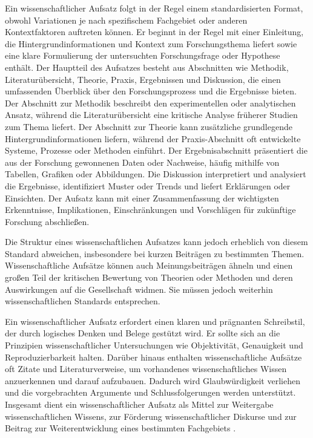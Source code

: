 \documentclass[12pt,        %
  english,ngerman,          %
  paper=a4,                 %
  captions=tablesignature,  %
  listof=numbered,          %
  bibliography=totoc,       %
  headings=small,           %
  headinclude=false,        %
  footinclude=false,        %
  parskip=half-,            %
  oneside,                  %
  DIV=12                    %
  ]{scrartcl}                %
\begin{document}
Ein wissenschaftlicher Aufsatz folgt in der Regel einem standardisierten Format, obwohl Variationen je nach spezifischem Fachgebiet oder anderen Kontextfaktoren auftreten können. Er beginnt in der Regel mit einer Einleitung, die Hintergrundinformationen und Kontext zum Forschungsthema liefert sowie eine klare Formulierung der untersuchten Forschungsfrage oder Hypothese enthält. Der Hauptteil des Aufsatzes besteht aus Abschnitten wie Methodik, Literaturübersicht, Theorie, Praxis, Ergebnissen und Diskussion, die einen umfassenden Überblick über den Forschungsprozess und die Ergebnisse bieten. Der Abschnitt zur Methodik beschreibt den experimentellen oder analytischen Ansatz, während die Literaturübersicht eine kritische Analyse früherer Studien zum Thema liefert. Der Abschnitt zur Theorie kann zusätzliche grundlegende Hintergrundinformationen liefern, während der Praxis-Abschnitt oft entwickelte Systeme, Prozesse oder Methoden einführt. Der Ergebnisabschnitt präsentiert die aus der Forschung gewonnenen Daten oder Nachweise, häufig mithilfe von Tabellen, Grafiken oder Abbildungen. Die Diskussion interpretiert und analysiert die Ergebnisse, identifiziert Muster oder Trends und liefert Erklärungen oder Einsichten. Der Aufsatz kann mit einer Zusammenfassung der wichtigsten Erkenntnisse, Implikationen, Einschränkungen und Vorschlägen für zukünftige Forschung abschließen.

Die Struktur eines wissenschaftlichen Aufsatzes kann jedoch erheblich von diesem Standard abweichen, insbesondere bei kurzen Beiträgen zu bestimmten Themen. Wissenschaftliche Aufsätze können auch Meinungsbeiträgen ähneln und einen großen Teil der kritischen Bewertung von Theorien oder Methoden und deren Auswirkungen auf die Gesellschaft widmen. Sie müssen jedoch weiterhin wissenschaftlichen Standards entsprechen.

Ein wissenschaftlicher Aufsatz erfordert einen klaren und prägnanten Schreibstil, der durch logisches Denken und Belege gestützt wird. Er sollte sich an die Prinzipien wissenschaftlicher Untersuchungen wie Objektivität, Genauigkeit und Reproduzierbarkeit halten. Darüber hinaus enthalten wissenschaftliche Aufsätze oft Zitate und Literaturverweise, um vorhandenes wissenschaftliches Wissen anzuerkennen und darauf aufzubauen. Dadurch wird Glaubwürdigkeit verliehen und die vorgebrachten Argumente und Schlussfolgerungen werden unterstützt. Insgesamt dient ein wissenschaftlicher Aufsatz als Mittel zur Weitergabe wissenschaftlichen Wissens, zur Förderung wissenschaftlicher Diskurse und zur Beitrag zur Weiterentwicklung eines bestimmten Fachgebiets \citep{redman_maples-2017-good_essay_writing}.
\end{document}
